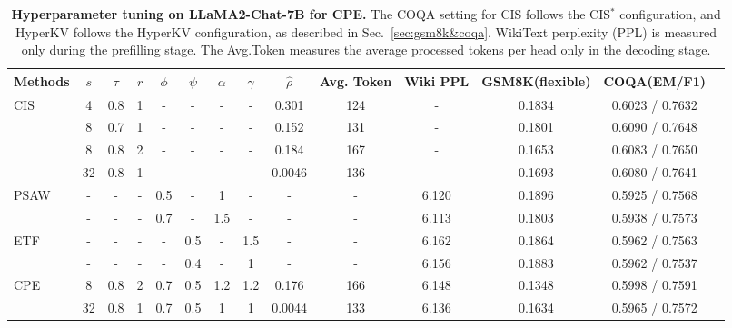 \begin{table}[t]
\centering
\caption{\textbf{Hyperparameter tuning on LLaMA2-Chat-7B for CPE.} The COQA setting for CIS follows the CIS$^\ast$ configuration, and HyperKV follows the HyperKV configuration, as described in Sec.~\ref{sec:gsm8k&coqa}. WikiText perplexity (PPL) is measured only during the prefilling stage. The Avg.Token measures the average processed tokens per head only in the decoding stage.}
\label{tab:hyper-tune}
\begin{tabular}{l|ccccccc|cccccc}
\toprule
Methods & $s$ & $\tau$ & $r$ & $\phi$ & $\psi$ & $\alpha$ & $\gamma$ & $\hat{\rho}$ & Avg. Token & Wiki PPL & GSM8K(flexible) & COQA(EM/F1)\\
\midrule
\multirow{4}{*}{CIS}
  & 4 & 0.8 & 1 & - & - & - & - & 0.301 & 124 & - & 0.1834 & 0.6023 / 0.7632\\
  & 8 & 0.7 & 1 & - & - & - & - & 0.152 & 131 & - & 0.1801 & 0.6090 / 0.7648\\
  & 8 & 0.8 & 2 & - & - & - & - & 0.184 & 167 & - & 0.1653 & 0.6083 / 0.7650\\
  & 32 & 0.8 & 1 & - & - & - & - & 0.0046 & 136 & - & 0.1693 & 0.6080 / 0.7641\\

\midrule

\multirow{2}{*}{PSAW}
  & - & - & - & 0.5 & - & 1 & - & - & - & 6.120 & 0.1896 & 0.5925 / 0.7568\\
  & - & - & - & 0.7 & - & 1.5 & - & - & - & 6.113 & 0.1803 & 0.5938 / 0.7573\\

\midrule

\multirow{2}{*}{ETF}
  & - & - & - & - & 0.5 & - & 1.5 & - & - & 6.162 & 0.1864 & 0.5962 / 0.7563\\
  & - & - & - & - & 0.4 & - & 1 & - & - & 6.156 & 0.1883 & 0.5962 / 0.7537\\

\midrule

\multirow{2}{*}{CPE}
  & 8 & 0.8 & 2 & 0.7 & 0.5 & 1.2 & 1.2 & 0.176 & 166 & 6.148 & 0.1348 & 0.5998 / 0.7591 \\
  & 32 & 0.8 & 1 & 0.7 & 0.5 & 1 & 1 & 0.0044 & 133 & 6.136 & 0.1634 & 0.5965 / 0.7572\\

\bottomrule
\end{tabular}
\end{table}